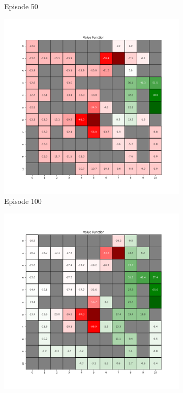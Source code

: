 \documentclass{assignment}
\begin{document}
\begin{figure}[H]
\begin{subfigure}{0.3\textwidth}
    \caption{Episode 50}
    \end{subfigure}\hfill
    \begin{subfigure}{0.3\textwidth}
        \includegraphics[width=\textwidth]{figures/value_td/default/value_function_alpha_0.1_gamma_0.95_epsilon_0.2_iteration_100.png}
    \caption{Episode 100}
    \end{subfigure}
    \begin{subfigure}{0.3\textwidth}
        \includegraphics[width=\textwidth]{figures/value_td/default/value_function_alpha_0.1_gamma_0.95_epsilon_0.2_iteration_1000.png}

\end{subfigure}
\end{figure}
\end{document}
